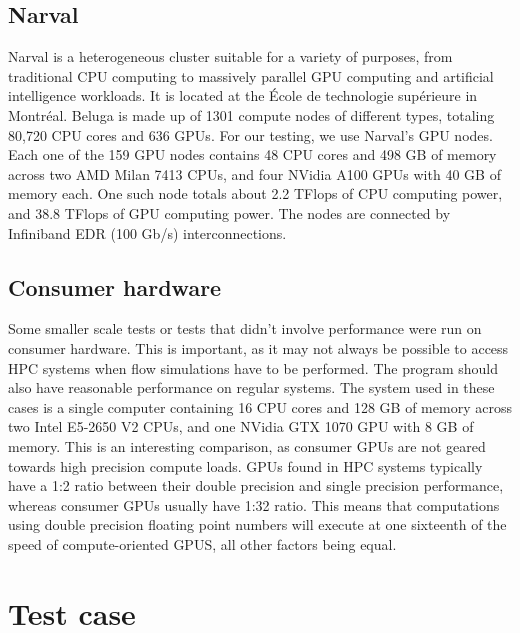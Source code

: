 \subsection{Narval} \label{section:results:platforms:narval}
Narval is a heterogeneous cluster suitable for a variety of purposes, from traditional CPU computing
to massively parallel GPU computing and artificial intelligence workloads. It is located at the
École de technologie supérieure in Montréal. Beluga is made up of 1301 compute nodes of different
types, totaling 80,720 CPU cores and 636 GPUs. For our testing, we use Narval's GPU nodes. Each one
of the 159 GPU nodes contains 48 CPU cores and 498 GB of memory across two AMD Milan 7413 CPUs, and
four NVidia A100 GPUs with 40 GB of memory each. One such node totals about 2.2 TFlops of CPU
computing power, and 38.8 TFlops of GPU computing power. The nodes are connected by Infiniband EDR
(100 Gb/s) interconnections.

\subsection{Consumer hardware} \label{section:results:platforms:consumer}
Some smaller scale tests or tests that didn't involve performance were run on consumer hardware.
This is important, as it may not always be possible to access HPC systems when flow simulations have
to be performed. The program should also have reasonable performance on regular systems. The system
used in these cases is a single computer containing 16 CPU cores and 128 GB of memory across two
Intel E5-2650 V2 CPUs, and one NVidia GTX 1070 GPU with 8 GB of memory. This is an interesting
comparison, as consumer GPUs are not geared towards high precision compute loads. GPUs found in HPC
systems typically have a 1:2 ratio between their double precision and single precision performance,
whereas consumer GPUs usually have 1:32 ratio. This means that computations using double precision
floating point numbers will execute at one sixteenth of the speed of compute-oriented GPUS, all
other factors being equal.

\section{Test case} \label{section:results:test_case}

